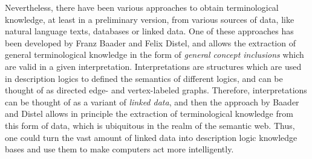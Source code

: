 Nevertheless, there have been various approaches to obtain terminological knowledge, at
least in a preliminary version, from various sources of data, like natural language texts,
databases or linked data.  One of these approaches has been developed by Franz Baader and
Felix Distel, and allows the extraction of general terminological knowledge in the form of
\emph{general concept inclusions} which are valid in a given interpretation.
Interpretations are structures which are used in description logics to defined the
semantics of different logics, and can be thought of as directed edge- and vertex-labeled
graphs.  Therefore, interpretations can be thought of as a variant of \emph{linked data},
and then the approach by Baader and Distel allows in principle the extraction of
terminological knowledge from this form of data, which is ubiquitous in the realm of the
semantic web.  Thus, one could turn the vast amount of linked data into description logic
knowledge bases and use them to make computers act more intelligently.




